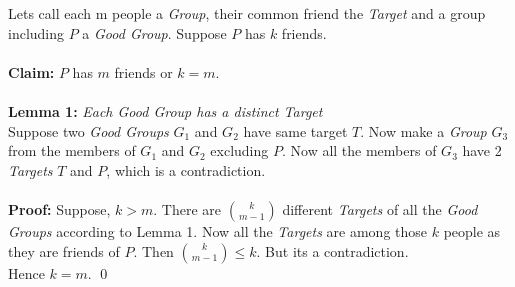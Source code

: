\documentclass[varwidth, margin=2mm]{standalone}
\begin{document}
Lets call each m people a \emph{Group}, their common friend the \emph{Target} and a group including $P$ a \emph{Good Group}. Suppose $P$ has $k$ friends.
\\\\
\textbf{Claim:} $P$ has $m$ friends or $k=m$.
\\\\
\textbf{Lemma 1:} \emph{Each \emph{Good Group} has a distinct \emph{Target}}
\\
Suppose two \emph{Good Groups} $G_1$ and $G_2$ have same target $T$. Now make a \emph{Group} $G_3$ from the members of $G_1$ and $G_2$ excluding $P$. Now all the members of $G_3$ have 2 \emph{Targets} $T$ and $P$,  which is a contradiction.
\\\\ 
\textbf{Proof:} Suppose, $k > m$. There are $\binom{k}{m-1}$ different \emph{Targets} of all the \emph{Good Groups}  according to Lemma 1. Now all the \emph{Targets} are among those $k$ people as they are friends of $P$. Then $\binom{k}{m-1} \leq k$. But its a contradiction. 
\\
Hence $k=m$. \qed
\end{document}
